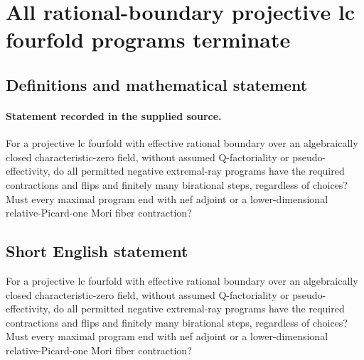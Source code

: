 \documentclass[11pt]{article}
\begin{document}
\section*{All rational-boundary projective lc fourfold programs terminate}\label{30007010}
\subsection{Definitions and mathematical statement}
\paragraph{Statement recorded in the supplied source.}
For a projective lc fourfold with effective rational boundary over an algebraically closed characteristic-zero field, without assumed Q-factoriality or pseudo-effectivity, do all permitted negative extremal-ray programs have the required contractions and flips and finitely many birational steps, regardless of choices? Must every maximal program end with nef adjoint or a lower-dimensional relative-Picard-one Mori fiber contraction?
\subsection{Short English statement}
For a projective lc fourfold with effective rational boundary over an algebraically closed characteristic-zero field, without assumed Q-factoriality or pseudo-effectivity, do all permitted negative extremal-ray programs have the required contractions and flips and finitely many birational steps, regardless of choices? Must every maximal program end with nef adjoint or a lower-dimensional relative-Picard-one Mori fiber contraction?
\end{document}
